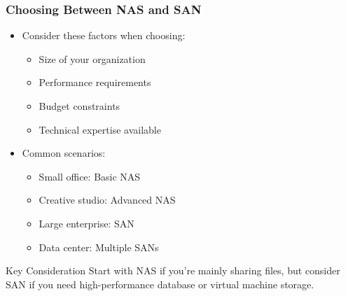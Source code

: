 \documentclass{beamer}
\begin{document}
\begin{frame}
    \frametitle{Choosing Between NAS and SAN}
    
    \begin{itemize}
        \item Consider these factors when choosing:
        \begin{itemize}
            \item Size of your organization
            \item Performance requirements
            \item Budget constraints
            \item Technical expertise available
        \end{itemize}
        
        \item Common scenarios:
        \begin{itemize}
            \item Small office: Basic NAS
            \item Creative studio: Advanced NAS
            \item Large enterprise: SAN
            \item Data center: Multiple SANs
        \end{itemize}
    \end{itemize}
    
    \begin{alertblock}{Key Consideration}
        Start with NAS if you're mainly sharing files, but consider SAN if you need high-performance database or virtual machine storage.
    \end{alertblock}
\end{frame}
\end{document}
